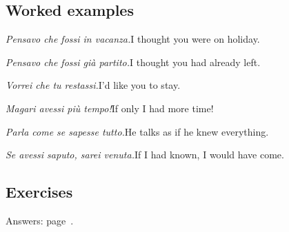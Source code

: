 \documentclass[11pt,a4paper,twoside,openright]{book}
\begin{document}
\subsection*{Worked examples}
\begin{examples}
\item\relax \textit{Pensavo che fossi in vacanza.}\newline I thought you were on holiday.
\item\relax \textit{Pensavo che fossi già partito.}\newline I thought you had already left.
\item\relax \textit{Vorrei che tu restassi.}\newline I'd like you to stay.
\item\relax \textit{Magari avessi più tempo!}\newline If only I had more time!
\item\relax \textit{Parla come se sapesse tutto.}\newline He talks as if he knew everything.
\item\relax \textit{Se avessi saputo, sarei venuta.}\newline If I had known, I would have come.
\end{examples}

\subsection*{Exercises}\label{les:congiuntivo-imperfetto-trapassato:exercises}
{\color{muted}\small Answers: page~\pageref{ans:congiuntivo-imperfetto-trapassato}.}
\end{document}
